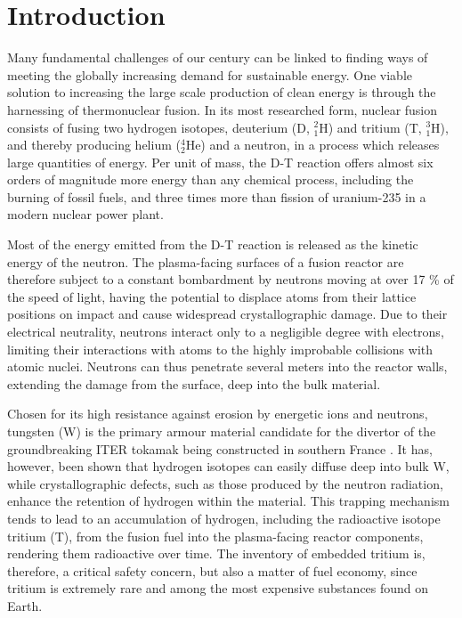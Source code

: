 \chapter{Introduction}

Many fundamental challenges of our century can be linked to finding ways of meeting the globally increasing demand for sustainable energy. 
One viable solution to increasing the large scale production of clean energy is through the harnessing of thermonuclear fusion. 
In its most researched form, nuclear fusion consists of fusing two hydrogen isotopes, deuterium (D, $^2_1$H) and tritium (T, $^3_1$H), and thereby producing helium ($^4_2$He) and a neutron, in a process which releases large quantities of energy. 
Per unit of mass, the D-T reaction offers almost six orders of magnitude more energy than any chemical process, including the burning of fossil fuels, and three times more than fission of uranium-235 in a modern nuclear power plant.  

Most of the energy emitted from the D-T reaction is released as the kinetic energy of the neutron. 
The plasma-facing surfaces of a fusion reactor are therefore subject to a constant bombardment by neutrons moving at over 17 \% of the speed of light, having the potential to displace atoms from their lattice positions on impact and cause widespread crystallographic damage. 
Due to their electrical neutrality, neutrons interact only to a negligible degree with electrons, limiting their interactions with atoms to the highly improbable collisions with atomic nuclei. 
Neutrons can thus penetrate several meters into the reactor walls, extending the damage from the surface, deep into the bulk material. 

Chosen for its high resistance against erosion by energetic ions and neutrons, tungsten (W) is the primary armour material candidate for the divertor of the groundbreaking ITER tokamak being constructed in southern France \cite{hirai2013iter}. %
It has, however, been shown that hydrogen isotopes can easily diffuse deep into bulk W, while crystallographic defects, such as those produced by the neutron radiation, enhance the retention of hydrogen within the material. \cite{tanabe2014review} 
This trapping mechanism tends to lead to an accumulation of hydrogen, including the radioactive isotope tritium (T), from the fusion fuel into the plasma-facing reactor components, rendering them radioactive over time. 
The inventory of embedded tritium is, therefore, a critical safety concern, but also a matter of fuel economy, since tritium is extremely rare and among the most expensive substances found on Earth.

